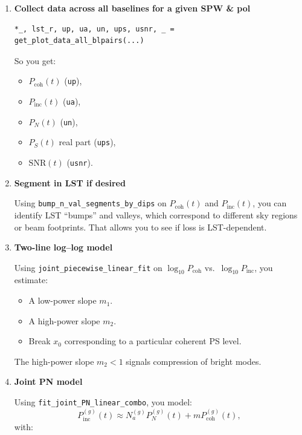 \documentclass[11pt]{article}
\begin{document}
\begin{enumerate}[leftmargin=*]
  \item \textbf{Collect data across all baselines for a given SPW \& pol}

\begin{verbatim}
*_, lst_r, up, ua, un, ups, usnr, _ = get_plot_data_all_blpairs(...)
\end{verbatim}

So you get:

\begin{itemize}[leftmargin=*]
  \item $P_{\mathrm{coh}}(t)$ (\texttt{up}),
  \item $P_{\mathrm{inc}}(t)$ (\texttt{ua}),
  \item $P_{N}(t)$ (\texttt{un}),
  \item $P_S(t)$ real part (\texttt{ups}),
  \item $\mathrm{SNR}(t)$ (\texttt{usnr}).
\end{itemize}

  \item \textbf{Segment in LST if desired}

Using \texttt{bump\_n\_val\_segments\_by\_dips} on $P_{\mathrm{coh}}(t)$ and $P_{\mathrm{inc}}(t)$, you can identify LST ``bumps'' and valleys, which correspond to different sky regions or beam footprints. That allows you to see if loss is LST-dependent.

  \item \textbf{Two-line log--log model}

Using \texttt{joint\_piecewise\_linear\_fit} on $\log_{10} P_{\mathrm{coh}}$ vs.\ $\log_{10} P_{\mathrm{inc}}$, you estimate:

\begin{itemize}[leftmargin=*]
  \item A low-power slope $m_1$.
  \item A high-power slope $m_2$.
  \item Break $x_0$ corresponding to a particular coherent PS level.
\end{itemize}

The high-power slope $m_2 < 1$ signals compression of bright modes.

  \item \textbf{Joint PN model}

Using \texttt{fit\_joint\_PN\_linear\_combo}, you model:
\[
  P_{\mathrm{inc}}^{(g)}(t) \approx N_a^{(g)} P_N^{(g)}(t) + m P_{\mathrm{coh}}^{(g)}(t),
\]
with:


\end{enumerate}
\end{document}

